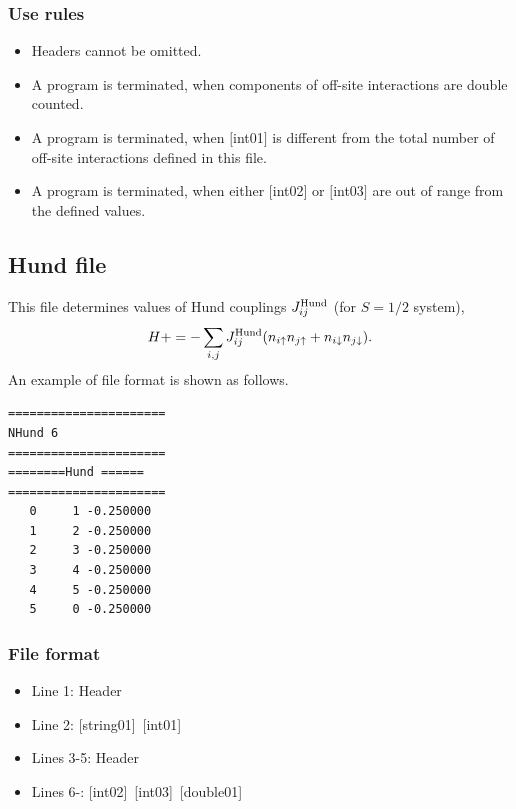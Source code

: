 \subsubsection{Use rules}
\begin{itemize}
\item Headers cannot be omitted. 
\item A program is terminated, when components of off-site interactions are double counted.
\item A program is terminated, when $[$int01$]$ is different from the total number of off-site interactions defined in this file.
\item A program is terminated, when either $[$int02$]$ or $[$int03$]$ are out of range from the defined values.
\end{itemize}

\newpage
\subsection{Hund file}
This file determines values of Hund couplings $J_{ij}^{\rm Hund}$ {(for $S=1/2$ system)},
\begin{equation}
H+=-\sum_{i,j}J_{ij}^{\rm Hund} (n_{i\uparrow}n_{j\uparrow}+n_{i\downarrow}n_{j\downarrow}).
\end{equation}
An example of file format is shown as follows.

\begin{minipage}{12.5cm}
\begin{screen}
\begin{verbatim}
====================== 
NHund 6  
====================== 
========Hund ====== 
====================== 
   0     1 -0.250000
   1     2 -0.250000
   2     3 -0.250000
   3     4 -0.250000
   4     5 -0.250000
   5     0 -0.250000
\end{verbatim}
\end{screen}
\end{minipage}

\subsubsection{File format}
 \begin{itemize}
   \item  Line 1:  Header
   \item  Line 2:   [string01]~[int01]
   \item  Lines 3-5:  Header
   \item  Lines 6-: 
   [int02]~[int03]~[double01] 
  \end{itemize}

